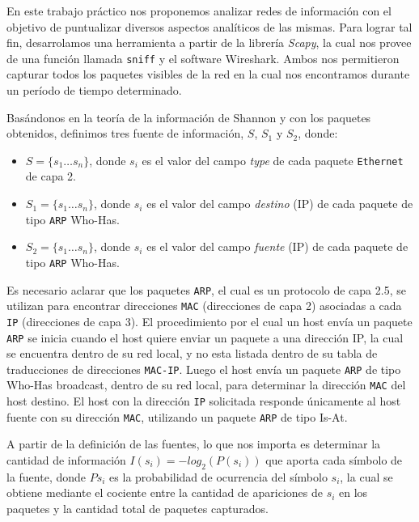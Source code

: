 En este trabajo práctico nos proponemos analizar redes de información con el objetivo de puntualizar diversos aspectos analíticos de las mismas. Para lograr tal fin, desarrolamos una herramienta a partir de la librería \textit{Scapy}, la cual nos provee de una función llamada \texttt{sniff} y el software Wireshark. Ambos nos permitieron capturar todos los paquetes visibles de la red en la cual nos encontramos durante un período de tiempo determinado.

Basándonos en la teoría de la información de Shannon y con los paquetes obtenidos, definimos tres fuente de información, $S$, $S_{1}$ y $S_{2}$, donde:

\begin{itemize}
  \item $S = \{s_{1} \dots s_{n}\}$, donde $s_{i}$ es el valor del campo \emph{type} de cada paquete \texttt{Ethernet} de capa 2.
  \item $S_{1} = \{s_{1} \dots s_{n}\} $, donde $s_i$ es el valor del campo \emph{destino} (IP) de cada paquete de
  tipo \texttt{ARP} Who-Has.
  \item $S_{2} = \{s_{1} \dots s_{n}\} $, donde $s_i$ es el valor del campo \emph{fuente} (IP) de cada paquete de
  tipo \texttt{ARP} Who-Has.
\end{itemize}

Es necesario aclarar que los paquetes \texttt{ARP}, el cual es un protocolo de capa 2.5, se utilizan para encontrar direcciones \texttt{MAC} (direcciones de capa 2) asociadas a cada \texttt{IP} (direcciones de capa 3). El procedimiento por el cual un host envía un paquete \texttt{ARP} se inicia cuando el host quiere enviar un paquete a una dirección IP, la cual se encuentra dentro de su red local, y no esta listada dentro de su tabla de traducciones de direcciones \texttt{MAC-IP}. Luego el host envía un paquete \texttt{ARP} de tipo Who-Has broadcast, dentro de su red local, para determinar la dirección \texttt{MAC} del host destino. El host con la dirección \texttt{IP} solicitada responde únicamente al host fuente con su dirección \texttt{MAC}, utilizando un paquete \texttt{ARP} de tipo Is-At.

A partir de la definición de las fuentes, lo que nos importa es determinar la cantidad de información $I(s_{i}) = -log_2(P(s_{i}))$ que aporta cada símbolo de la fuente, donde $Ps_{i}$ es la probabilidad de ocurrencia del símbolo $s_{i}$, la cual se obtiene mediante el cociente entre la cantidad de apariciones de $s_{i}$ en los paquetes y la cantidad total de paquetes capturados.

